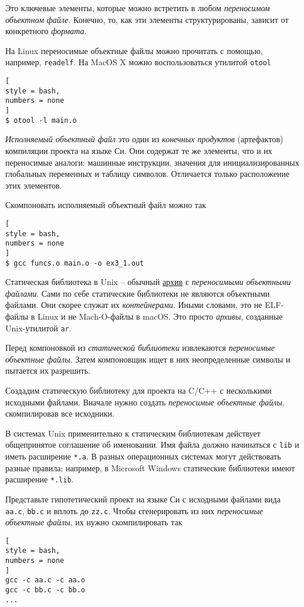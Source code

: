 \documentclass[%
	11pt,
	a4paper,
	utf8,
		]{article}
\begin{document}
Это ключевые элементы, которые можно встретить в любом \emph{переносимом объектном файле}. Конечно, то, как эти элементы структурированы, зависит от конкретного \emph{формата}.

На Linux переносимые объектные файлы можно прочитать с помощью, например, \verb|readelf|. На MacOS X можно воспользоваться утилитой \verb|otool|
\begin{lstlisting}[
style = bash,
numbers = none
]
$ otool -l main.o
\end{lstlisting}

\emph{Исполняемый объектный файл} это один из \emph{конечных продуктов} (артефактов) компиляции проекта на языке Си. Они содержат те же элементы, что и их переносимые аналоги: машинные инструкции, значения для инициализированных глобальных переменных и таблицу символов. Отличается только расположение этих элементов.

Скомпоновать исполняемый объектный файл можно так
\begin{lstlisting}[
style = bash,
numbers = none
]
$ gcc funcs.o main.o -o ex3_1.out
\end{lstlisting}

Статическая библиотека в Unix -- обычный \underline{архив} с \emph{переносимыми объектными файлами}. Сами по себе статические библиотеки не являются объектными файлами. Они скорее служат их \emph{контейнерами}. Иными словами, это не ELF-файлы в Linux и не Mach-O-файлы в macOS. Это просто \emph{архивы}, созданные Unix-утилитой \verb|ar|.

Перед компоновкой из \emph{статической библиотеки} извлекаются \emph{переносимые объектные файлы}. Затем компоновщик ищет в них неопределенные символы и пытается их разрешить.

Создадим статическую библиотеку для проекта на C/C++ с несколькими исходными файлами. Вначале нужно создать \emph{переносимые объектные файлы}, скомпилировав все исходники.

В системах Unix применительно к статическим библиотекам действует общепринятое соглашение об именовании. Имя файла должно начинаться с \verb|lib| и иметь расширение \verb|*.a|. В разных операционных системах могут действовать разные правила; например, в Microsoft Windows статические библиотеки имеют расширение \verb|*.lib|.

Представьте гипотетический проект на языке Си с исходными файлами вида \verb|aa.c|, \verb|bb.c| и вплоть до \verb|zz.c|. Чтобы сгенерировать из них \emph{переносимые объектные файлы}, их нужно скомпилировать так
\begin{lstlisting}[
style = bash,
numbers = none
]
gcc -c aa.c -c aa.o
gcc -c bb.c -c bb.o
...
\end{lstlisting}
\end{document}
